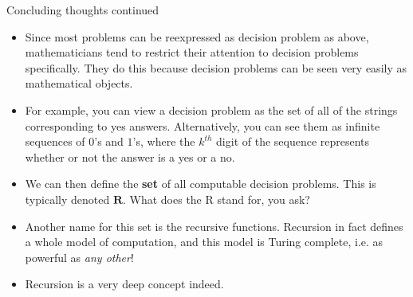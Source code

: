 \documentclass{beamer}
\begin{document}
\begin{frame}{Concluding thoughts continued}
    \begin{itemize}
        \item Since most problems can be reexpressed as decision problem as above, mathematicians tend to restrict their attention to decision problems specifically. They do this because decision problems can be seen very easily as mathematical objects. 
        \item For example, you can view a decision problem as the set of all of the strings corresponding to yes answers. Alternatively, you can see them as infinite sequences of $0$'s and $1$'s, where the $k^{th}$ digit of the sequence represents whether or not the answer is a yes or a no. 
        \item We can then define the \textbf{set} of all computable decision problems. This is typically denoted $\mathbf{R}$. What does the R stand for, you ask?
        \item Another name for this set is the recursive functions. Recursion in fact defines a whole model of computation, and this model is Turing complete, i.e. as powerful as \emph{any other}! 
        \item Recursion is a very deep concept indeed. 
    \end{itemize}
\end{frame}
\end{document}

